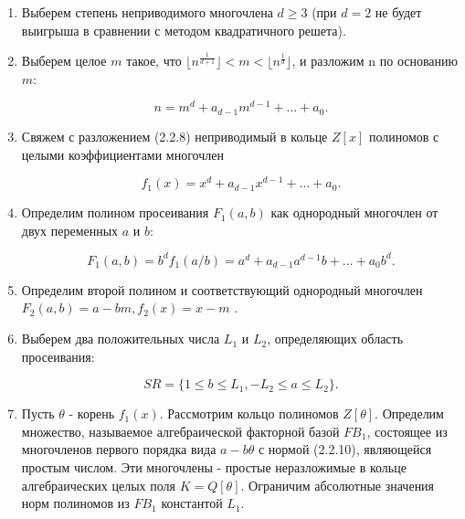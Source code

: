     \begin{enumerate}
      \item Выберем степень неприводимого многочлена {$d \ge 3$} (при {$d = 2$} не будет выигрыша в сравнении с методом квадратичного решета).
      \item Выберем целое {$m$} такое, что {$\lfloor n^\frac{1}{d+1} \rfloor < m < \lfloor n^\frac{1}{d} \rfloor$}, и разложим n по 
	основанию {$m$}:
	
	  \begin{equation} \label{eq:prime-fact-nmd}
	   n = m^d + a_{d-1}m^{d-1} + \dots + a_0.
	  \end{equation}

      \item Свяжем с разложением (2.2.8) неприводимый в кольце {$Z[x]$} полиномов с целыми коэффициентами многочлен
      
	\begin{equation} \label{eq:prime-fact-f1xd}
	 f_1(x)=x^d + a_{d-1}x^{d-1} + \dots + a_0.
	\end{equation}

      \item Определим полином просеивания {$F_1(a,b)$} как однородный многочлен от двух переменных {$a$} и {$b$}:
      
	\begin{equation} \label{eq:prime-fact-F1ab}
	 F_1(a,b) = b^d f_1(a/b) = a^d + a_{d-1}a^{d-1}b + \dots + a_0 b^d.
	\end{equation}

      \item Определим второй полином и соответствующий однородный многочлен {$F_2(a,b)=a-bm, f_2(x)=x-m$} .
      \item Выберем два положительных числа {$L_1$} и {$L_2$}, определяющих область просеивания:
      
	\begin{equation} \label{eq:prime-fact-SR}
	 SR = \{ 1 \le b \le L_1, -L_2 \le a \le L_2 \}.
	\end{equation}

      \item Пусть {$\theta$} - корень {$f_1(x)$}. Рассмотрим кольцо полиномов {$Z[\theta]$}. Определим множество, называемое алгебраической 
	факторной базой {$FB_1$}, состоящее из многочленов первого порядка вида {$a-b\theta$} с нормой (2.2.10), являющейся простым числом. 
	Эти многочлены - простые неразложимые в кольце алгебраических целых поля {$K=Q[\theta]$}. Ограничим абсолютные значения норм 
	полиномов из {$FB_1$} константой {$L_1$}.
	

\end{enumerate}
